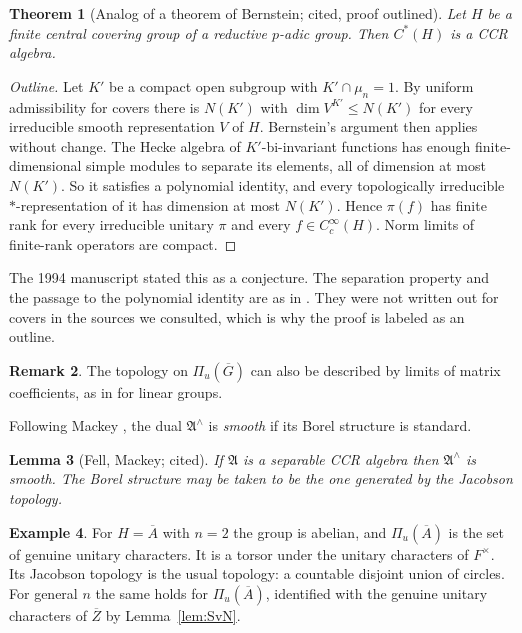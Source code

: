 \documentclass[12pt,letterpaper]{article}
\numberwithin{equation}{section}
\newtheorem{theorem}{Theorem}[section]
\newtheorem{lemma}[theorem]{Lemma}
\theoremstyle{definition}
\newtheorem{xexample}[theorem]{Example}
\newtheorem{xremark}[theorem]{Remark}
\newcommand{\cited}{cited}
\newcommand{\outl}{proof outlined}
\newcommand{\bG}{\overline{G}}
\newcommand{\bA}{\overline{A}}
\newcommand{\bZ}{\overline{Z}}
\newcommand{\Piu}{\Pi_{u}(\bG)}
\begin{document}
\begin{theorem}[Analog of a theorem of Bernstein; \cited, \outl]\label{thm:CCR}
Let $H$ be a finite central covering group of a reductive $p$-adic group.  Then $C^*(H)$
is a CCR algebra.
\end{theorem}
\begin{proof}[Outline]
Let $K'$ be a compact open subgroup with $K'\cap\mu_n=1$.  By uniform admissibility for
covers \cite[Theorem~3.4]{KS23} there is $N(K')$ with $\dim V^{K'}\le N(K')$ for every
irreducible smooth representation $V$ of $H$.  Bernstein's argument \cite{Be74} then
applies without change.  The Hecke algebra of $K'$-bi-invariant functions has enough
finite-dimensional simple modules to separate its elements, all of dimension at most
$N(K')$.  So it satisfies a polynomial identity, and every topologically irreducible
$*$-representation of it has dimension at most $N(K')$.  Hence $\pi(f)$ has finite rank
for every irreducible unitary $\pi$ and every $f\in C_c^\infty(H)$.  Norm limits of
finite-rank operators are compact.
\end{proof}
The 1994 manuscript stated this as a conjecture.  The separation property and the passage
to the polynomial identity are as in \cite{Be74}.  They were not written out for covers in
the sources we consulted, which is why the proof is labeled as an outline.

\begin{xremark}
The topology on $\Piu$ can also be described by limits of matrix coefficients, as in
\cite{Ta83} for linear groups.
\end{xremark}

Following Mackey \cite{Ma57}, the dual $\mathfrak A^\wedge$ is \emph{smooth} if its Borel
structure is standard.

\begin{lemma}[Fell, Mackey; \cited]\label{lem:fell}
If $\mathfrak A$ is a separable CCR algebra then $\mathfrak A^\wedge$ is smooth.  The Borel
structure may be taken to be the one generated by the Jacobson topology.
\end{lemma}

\begin{xexample}
For $H=\bA$ with $n=2$ the group is abelian, and $\Pi_u(\bA)$ is the set of genuine unitary
characters.  It is a torsor under the unitary characters of $F^\times$.  Its Jacobson
topology is the usual topology: a countable disjoint union of circles.  For general $n$
the same holds for $\Pi_u(\bA)$, identified with the genuine unitary characters of $\bZ$
by Lemma~\ref{lem:SvN}.
\end{xexample}
\end{document}
